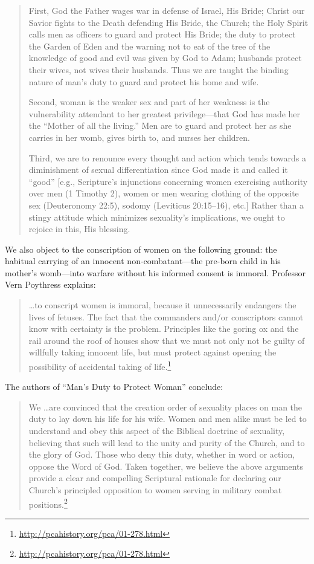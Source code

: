 \documentclass[
]{book}
\begin{document}
\begin{quote}
First, God the Father wages war in defense of Israel, His Bride; Christ our Savior fights to the Death defending His Bride, the Church; the Holy Spirit calls men as officers to guard and protect His Bride; the duty to protect the Garden of Eden and the warning not to eat of the tree of the knowledge of good and evil was given by God to Adam; husbands protect their wives, not wives their husbands. Thus we are taught the binding nature of man's duty to guard and protect his home and wife.

Second, woman is the weaker sex and part of her weakness is the vulnerability attendant to her greatest privilege---that God has made her the ``Mother of all the living.'' Men are to guard and protect her as she carries in her womb, gives birth to, and nurses her children.

Third, we are to renounce every thought and action which tends towards a diminishment of sexual differentiation since God made it and called it ``good'' {[}e.g., Scripture's injunctions concerning women exercising authority over men (1 Timothy 2), women or men wearing clothing of the opposite sex (Deuteronomy 22:5), sodomy (Leviticus 20:15--16), etc.{]} Rather than a stingy attitude which minimizes sexuality's implications, we ought to rejoice in this, His blessing.
\end{quote}

We also object to the conscription of women on the following ground: the habitual carrying of an innocent non-combatant---the pre-born child in his mother's womb---into warfare without his informed consent is immoral. Professor Vern Poythress explains:

\begin{quote}
\ldots to conscript women is immoral, because it unnecessarily endangers the lives of fetuses. The fact that the commanders and/or conscriptors cannot know with certainty is the problem. Principles like the goring ox and the rail around the roof of houses show that we must not only not be guilty of willfully taking innocent life, but must protect against opening the possibility of accidental taking of life.\footnote{\url{http://pcahistory.org/pca/01-278.html}}
\end{quote}

The authors of ``Man's Duty to Protect Woman'' conclude:

\begin{quote}
We \ldots are convinced that the creation order of sexuality places on man the duty to lay down his life for his wife. Women and men alike must be led to understand and obey this aspect of the Biblical doctrine of sexuality, believing that such will lead to the unity and purity of the Church, and to the glory of God. Those who deny this duty, whether in word or action, oppose the Word of God. Taken together, we believe the above arguments provide a clear and compelling Scriptural rationale for declaring our Church's principled opposition to women serving in military combat positions.\footnote{\url{http://pcahistory.org/pca/01-278.html}}
\end{quote}
\end{document}
